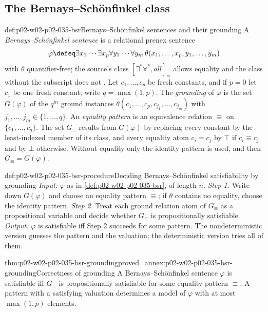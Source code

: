 \subsection{The Bernays--Sch\"onfinkel class}
\label{sec:p02-w02-p02-035-bsr}

\begin{hbdefinition}{def:p02-w02-p02-035-bsr}{Bernays--Sch\"onfinkel sentences and their grounding}
A \emph{Bernays--Sch\"onfinkel sentence} is a relational prenex sentence
\[
 \varphi\defeq\exists x_1\cdots\exists x_p\forall y_1\cdots\forall y_m\,
 \theta(x_1,\ldots,x_p,y_1,\ldots,y_m)
\]
with \(\theta\) quantifier-free; the source's class \([\exists^{*}\forall^{*},
\mathit{all}]_{=}\) allows equality and the class without the subscript does
not \cite[sect.~6.2.2]{BorgerGradelGurevich1997}.  Let \(c_1,\ldots,c_p\) be
fresh constants, and if \(p=0\) let \(c_1\) be one fresh constant; write
\(q=\max(1,p)\).  The \emph{grounding} of \(\varphi\) is the set
\(G(\varphi)\) of the \(q^m\) ground instances
\(\theta(c_1,\ldots,c_p,c_{j_1},\ldots,c_{j_m})\) with
\(j_1,\ldots,j_m\in\{1,\ldots,q\}\).  An \emph{equality pattern} is an
equivalence relation \(\equiv\) on \(\{c_1,\ldots,c_q\}\).  The set
\(G_\equiv\) results from \(G(\varphi)\) by replacing every constant by the
least-indexed member of its class, and every equality atom \(c_i=c_j\) by
\(\top\) if \(c_i\equiv c_j\) and by \(\bot\) otherwise.  Without equality only
the identity pattern is used, and then \(G_\equiv=G(\varphi)\).
\end{hbdefinition}

\begin{hbmethod}{def:p02-w02-p02-035-bsr-procedure}{Deciding Bernays--Sch\"onfinkel satisfiability by grounding}
\emph{Input:} \(\varphi\) as in \cref{def:p02-w02-p02-035-bsr}, of length
\(n\).
\emph{Step 1.} Write down \(G(\varphi)\) and choose an equality pattern
\(\equiv\); if \(\theta\) contains no equality, choose the identity pattern.
\emph{Step 2.} Treat each ground relation atom of \(G_\equiv\) as a
propositional variable and decide whether \(G_\equiv\) is propositionally
satisfiable.
\emph{Output:} \(\varphi\) is satisfiable iff Step 2 succeeds for some
pattern.  The nondeterministic version guesses the pattern and the valuation;
the deterministic version tries all of them.
\end{hbmethod}

\begin{hbtheorem}{thm:p02-w02-p02-035-bsr-grounding}{proved=annex:p02-w02-p02-035-bsr-grounding}{Correctness of grounding}
A Bernays--Sch\"onfinkel sentence \(\varphi\) is satisfiable iff
\(G_\equiv\) is propositionally satisfiable for some equality pattern
\(\equiv\).  A pattern with a satisfying valuation determines a model of \(\varphi\) with at
most \(\max(1,p)\) elements.
\end{hbtheorem}

